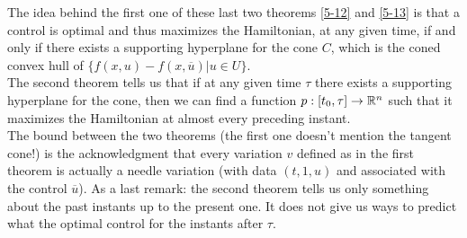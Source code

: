 The idea behind the first one of these last two theorems \ref{5-12} and \ref{5-13} is that  a control is optimal and thus maximizes the Hamiltonian, at any given time, if and only if there exists a supporting hyperplane for the cone $C$, which is the coned convex hull of $\{f(x,u)-f(x,\overline{u})|u\in U \}$.\\
The second theorem tells us that if at any given time $\tau$ there exists a supporting hyperplane for the cone, then we can find a function $p:[t_0,\tau]\rightarrow\mathbb{R}^n$ such that it maximizes the Hamiltonian at almost every preceding instant.\\
The bound between the two theorems (the first one doesn't mention the tangent cone!) is the acknowledgment that every variation $v$ defined  as in the first theorem is actually a needle variation (with data $(t,1,u)$ and associated with the control $\overline u$).
As a last remark: the second theorem tells us only something about the past instants up to the present one. It does not give us ways to predict what the optimal control for the instants after $\tau$.\\


